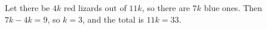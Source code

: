 Let there be $4k$ red lizards out of $11k$, so there are $7k$ blue ones. Then $7k-4k=9$, so $k=3$, and the total is $11k=\boxed{33}$.
